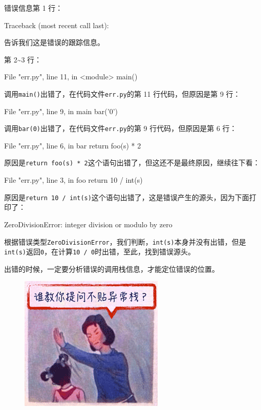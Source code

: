 错误信息第 1 行：

\begin{pythoncode}
Traceback (most recent call last):
\end{pythoncode}

告诉我们这是错误的跟踪信息。

第 2\textasciitilde3 行：

\begin{pythoncode}
  File "err.py", line 11, in <module>
    main()
\end{pythoncode}

调用\texttt{main()}出错了，在代码文件\texttt{err.py}的第 11
行代码，但原因是第 9 行：

\begin{pythoncode}
  File "err.py", line 9, in main
    bar('0')
\end{pythoncode}

调用\texttt{bar(\textquotesingle{}0\textquotesingle{})}出错了，在代码文件\texttt{err.py}的第
9 行代码，但原因是第 6 行：

\begin{pythoncode}
  File "err.py", line 6, in bar
    return foo(s) * 2
\end{pythoncode}

原因是\texttt{return\ foo(s)\ *\ 2}这个语句出错了，但这还不是最终原因，继续往下看：

\begin{pythoncode}
  File "err.py", line 3, in foo
    return 10 / int(s)
\end{pythoncode}

原因是\texttt{return\ 10\ /\ int(s)}这个语句出错了，这是错误产生的源头，因为下面打印了：

\begin{pythoncode}
ZeroDivisionError: integer division or modulo by zero
\end{pythoncode}

根据错误类型\texttt{ZeroDivisionError}，我们判断，\texttt{int(s)}本身并没有出错，但是\texttt{int(s)}返回\texttt{0}，在计算\texttt{10\ /\ 0}时出错，至此，找到错误源头。

出错的时候，一定要分析错误的调用栈信息，才能定位错误的位置。

 
 \begin{figure}[htp]
	\centering
	\includegraphics[width=0.6\linewidth]{fig/1183105155068736l.png}
\end{figure}



